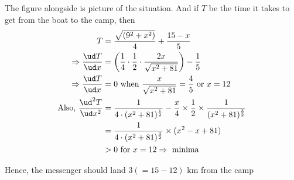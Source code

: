 \begin{solution}[\fullpage]
   The figure alongside is picture of the situation. And if $T$ be the time it 
   takes to get from the boat to the camp, then 
   \begin{align}
       T &= \dfrac{\sqrt{(9^2+x^2)}}{4} + \dfrac{15-x}{5} \\
       \Rightarrow \dfrac{\ud T}{\ud x} &= \left( \dfrac{1}{4}\cdot\dfrac{1}{2}\cdot\dfrac{2x}{\sqrt{x^2+81}}\right) - \dfrac{1}{5} \\
       \Rightarrow \dfrac{\ud T}{\ud x} &= 0\text{ when } \dfrac{x}{\sqrt{x^2+81}} = \dfrac{4}{5}
       \text{ or } x = 12 \\
       \text{Also, }\dfrac{\ud^2 T}{\ud x^2} &= \dfrac{1}{4\cdot(x^2+81)^{\frac{1}{2}}} 
                         - \dfrac{x}{4}\times\dfrac{1}{2}\times\dfrac{1}{(x^2+81)^{\frac{3}{2}}} \\
                         &= \dfrac{1}{4\cdot(x^2+81)^{\frac{3}{2}}}\times(x^2-x+81) \\
                         &> 0 \text{ for } x = 12 \Rightarrow \text{ minima }
   \end{align}
   
   Hence, the messenger should land $3(= 15 -12)$ km from the camp
\end{solution}
